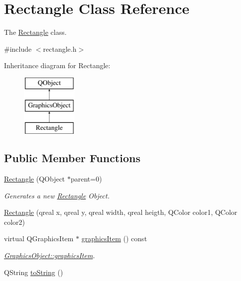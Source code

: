 \hypertarget{class_rectangle}{}\section{Rectangle Class Reference}
\label{class_rectangle}


The \hyperlink{class_rectangle}{Rectangle} class.  




{\ttfamily \#include $<$rectangle.\+h$>$}

Inheritance diagram for Rectangle\+:\begin{figure}[H]
\begin{center}
\leavevmode
\includegraphics[height=3.000000cm]{class_rectangle}
\end{center}
\end{figure}
\subsection*{Public Member Functions}
\begin{DoxyCompactItemize}
\item 
\hyperlink{class_rectangle_af7b47bc1819c9c74311686ec33e6b921}{Rectangle} (Q\+Object $\ast$parent=0)
\begin{DoxyCompactList}\small\item\em Generates a new \hyperlink{class_rectangle}{Rectangle} Object. \end{DoxyCompactList}\item 
\hyperlink{class_rectangle_a5338f8ff5aa04be36032562617fe0603}{Rectangle} (qreal x, qreal y, qreal width, qreal heigth, Q\+Color color1, Q\+Color color2)
\item 
virtual Q\+Graphics\+Item $\ast$ \hyperlink{class_rectangle_a6d2cdec338bb43ad533b98e58eea9e03}{graphics\+Item} () const
\begin{DoxyCompactList}\small\item\em \hyperlink{class_graphics_object_abd625951730f006e748570bf00d158bf}{Graphics\+Object\+::graphics\+Item}. \end{DoxyCompactList}\item 
Q\+String \hyperlink{class_rectangle_a75b1e77ef828ff8de86cfcf6b03bfadb}{to\+String} ()
\end{DoxyCompactItemize}


